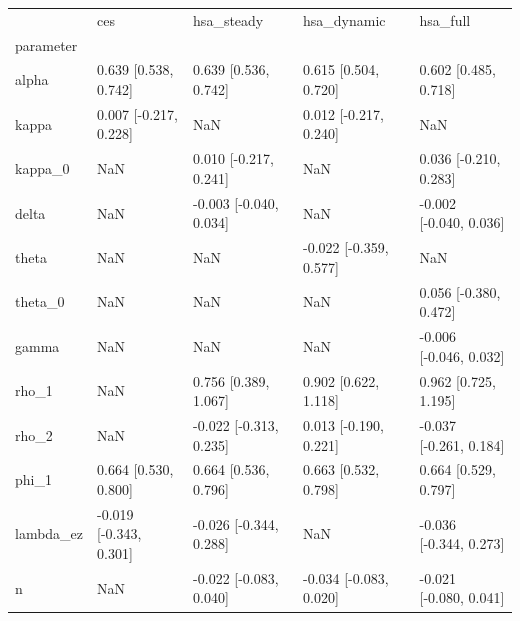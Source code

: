 \begin{tabular}{lllll}
\toprule
 & ces & hsa\_steady & hsa\_dynamic & hsa\_full \\
parameter &  &  &  &  \\
\midrule
alpha & 0.639 [0.538, 0.742] & 0.639 [0.536, 0.742] & 0.615 [0.504, 0.720] & 0.602 [0.485, 0.718] \\
kappa & 0.007 [-0.217, 0.228] & NaN & 0.012 [-0.217, 0.240] & NaN \\
kappa\_0 & NaN & 0.010 [-0.217, 0.241] & NaN & 0.036 [-0.210, 0.283] \\
delta & NaN & -0.003 [-0.040, 0.034] & NaN & -0.002 [-0.040, 0.036] \\
theta & NaN & NaN & -0.022 [-0.359, 0.577] & NaN \\
theta\_0 & NaN & NaN & NaN & 0.056 [-0.380, 0.472] \\
gamma & NaN & NaN & NaN & -0.006 [-0.046, 0.032] \\
rho\_1 & NaN & 0.756 [0.389, 1.067] & 0.902 [0.622, 1.118] & 0.962 [0.725, 1.195] \\
rho\_2 & NaN & -0.022 [-0.313, 0.235] & 0.013 [-0.190, 0.221] & -0.037 [-0.261, 0.184] \\
phi\_1 & 0.664 [0.530, 0.800] & 0.664 [0.536, 0.796] & 0.663 [0.532, 0.798] & 0.664 [0.529, 0.797] \\
lambda\_ez & -0.019 [-0.343, 0.301] & -0.026 [-0.344, 0.288] & NaN & -0.036 [-0.344, 0.273] \\
n & NaN & -0.022 [-0.083, 0.040] & -0.034 [-0.083, 0.020] & -0.021 [-0.080, 0.041] \\
\bottomrule
\end{tabular}
